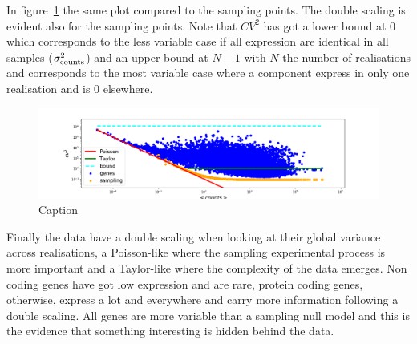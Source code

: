 In figure~\ref{fig:scalinglaws/gtex/cvmean_loglog_sampling} the same plot compared to the sampling points. The double scaling is evident also for the sampling points. Note that $CV^2$ has got a lower bound at $0$ which corresponds to the less variable case if all expression are identical in all samples ($\sigma^2_{\mathrm{counts}}$) and an upper bound at $N-1$ with $N$ the number of realisations and corresponds to the most variable case where a component  express in only one realisation and is $0$ elsewhere.
\begin{figure}[htb!]
    \centering
    \includegraphics[width=0.9\linewidth]{pictures/scalinglaws/gtex/cvmean_loglog_sampling.png}
    \caption{Caption}
    \label{fig:scalinglaws/gtex/cvmean_loglog_sampling}
\end{figure}

Finally the data have a double scaling when looking at their global variance across realisations, a Poisson-like where the sampling experimental process is more important and a Taylor-like where the complexity of the data emerges.
Non coding genes have got low expression and are rare, protein coding genes, otherwise, express a lot and everywhere and carry more information following a double scaling. All genes are more variable than a sampling null model and this is the evidence that something interesting is hidden behind the data.
